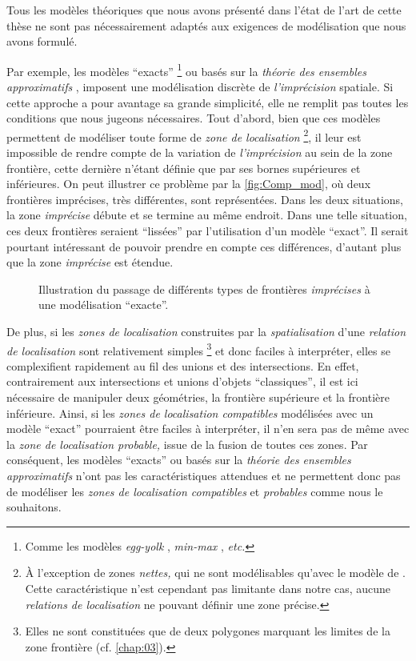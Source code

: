 Tous les modèles théoriques que nous avons présenté dans l'état de
l'art de cette thèse ne sont pas nécessairement adaptés aux exigences
de modélisation que nous avons formulé.

Par exemple, les modèles \enquote{exacts} \footnote{Comme les modèles
  \emph{egg-yolk} \autocite{Cohn1996}, \emph{min-max}
  \autocite{Clementini1996}, \emph{etc.}} ou basés sur la
\emph{théorie des ensembles approximatifs} \autocite{Pawlak1982},
imposent une modélisation discrète de \emph{l'imprécision}
spatiale. Si cette approche a pour avantage sa grande simplicité, elle
ne remplit pas toutes les conditions que nous jugeons
nécessaires. Tout d'abord, bien que ces modèles permettent de
modéliser toute forme de \emph{zone de localisation} \footnote{À
  l'exception de zones \emph{nettes,} qui ne sont modélisables qu'avec
  le modèle de \textcite{Bejaoui2009}. Cette caractéristique n'est
  cependant pas limitante dans notre cas, aucune \emph{relations de
    localisation} ne pouvant définir une zone précise.}, il leur est
impossible de rendre compte de la variation de \emph{l'imprécision} au
sein de la zone frontière, cette dernière n'étant définie que par ses
bornes supérieures et inférieures. On peut illustrer ce problème par
la \autoref{fig:Comp_mod}, où deux frontières imprécises, très
différentes, sont représentées. Dans les deux situations, la zone
\emph{imprécise} débute et se termine au même endroit. Dans une telle
situation, ces deux frontières seraient \enquote{lissées} par
l'utilisation d'un modèle \enquote{exact}. Il serait pourtant
intéressant de pouvoir prendre en compte ces différences, d'autant
plus que la zone \emph{imprécise} est étendue.

\begin{figure}
  \centering
  
  \caption{Illustration du passage de différents types de frontières
    \emph{imprécises} à une modélisation \enquote{exacte}.}
  \label{fig:Comp_mod}
\end{figure}

De plus, si les \emph{zones de localisation} construites par la
\emph{spatialisation} d'une \emph{relation de localisation} sont
relativement simples \footnote{Elles ne sont constituées que de deux
  polygones marquant les limites de la zone frontière
  (cf. \autoref{chap:03}).} et donc faciles à interpréter, elles se
complexifient rapidement au fil des unions et des intersections. En
effet, contrairement aux intersections et unions d'objets
\enquote{classiques}, il est ici nécessaire de manipuler deux
géométries, la frontière supérieure et la frontière inférieure. Ainsi,
si les \emph{zones de localisation compatibles} modélisées avec un
modèle \enquote{exact} pourraient être faciles à interpréter, il n'en
sera pas de même avec la \emph{zone de localisation probable,} issue
de la fusion de toutes ces zones. Par conséquent, les modèles
\enquote{exacts} ou basés sur la \emph{théorie des ensembles
  approximatifs} n'ont pas les caractéristiques attendues et ne
permettent donc pas de modéliser les \emph{zones de localisation
  compatibles} et \emph{probables} comme nous le souhaitons.

